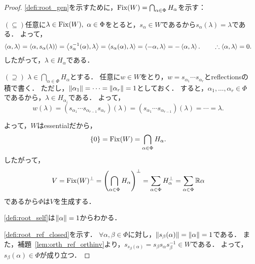 \begin{proof}
  \ref{defi:root_gen}を示すために，$\operatorname{Fix} (W) = \bigcap_{\alpha \in \Phi} H_\alpha$を示す：

  $(\subseteq)$任意に$\lambda \in \operatorname{Fix}(W),\ \alpha \in \Phi$をとると，$s_\alpha \in W$であるから$s_\alpha(\lambda) = \lambda$である．
  よって，
  \begin{equation}
    \left\langle \alpha, \lambda \right\rangle
    = \left\langle \alpha, s_\alpha(\lambda) \right\rangle
    = \left\langle s_\alpha^{-1}(\alpha), \lambda \right\rangle
    = \left\langle s_\alpha(\alpha), \lambda \right\rangle
    = \left\langle -\alpha, \lambda \right\rangle
    = -\left\langle \alpha, \lambda \right\rangle.
    \qquad \therefore \left\langle \alpha, \lambda \right\rangle = 0.
  \end{equation}
  したがって，$\lambda \in H_\alpha$である．

  $(\supseteq)$ $\lambda \in \bigcap_{\alpha \in \Phi} H_\alpha$とする．
  任意に$w \in W$をとり，$w = s_{\alpha_1} \cdots s_{\alpha_r}$とreflectionsの積で書く．
  ただし，$\left\| \alpha_1 \right\| = \cdots = \left\| \alpha_r \right\| = 1$としておく．
  すると，$\alpha_1, \ldots, \alpha_r \in \Phi$であるから，$\lambda \in H_{\alpha_i}$である．
  よって，
  \begin{equation}
    w(\lambda)
    = (s_{\alpha_1} \cdots s_{\alpha_{r-1}} s_{\alpha_r})(\lambda)
    = (s_{\alpha_1} \cdots s_{\alpha_{r-1}})(\lambda)
    = \cdots
    = \lambda.
  \end{equation}

  よって，$W$はessentialだから，
  \begin{equation}
    \{0\}
    = \operatorname{Fix}(W)
    = \bigcap_{\alpha \in \Phi} H_\alpha.
  \end{equation}
  したがって，
  \begin{equation}
    V
    = \operatorname{Fix}(W)^\perp
    = \left( \bigcap_{\alpha \in \Phi} H_\alpha \right)^\perp
    = \sum_{\alpha \in \Phi} H_\alpha^\perp
    = \sum_{\alpha \in \Phi} \mathbb{R}\alpha
  \end{equation}
  であるから$\Phi$は$V$を生成する．

  \ref{defi:root_self}は$\left\| \alpha \right\| = 1$からわかる．

  \ref{defi:root_ref_closed}を示す．
  $\forall \alpha, \beta \in \Phi$に対し，$\left\| s_\beta(\alpha) \right\| = \left\| \alpha \right\| = 1$である．
  また，補題~\ref{lem:orth_ref_orthinv}より，$s_{s_\beta(\alpha)} = s_\beta s_\alpha s_\beta^{-1} \in W$である．
  よって，$s_\beta(\alpha) \in \Phi$が成り立つ．
\end{proof}

